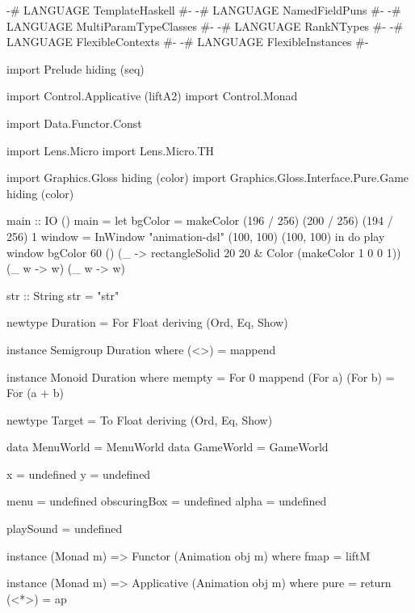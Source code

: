 \begin{code}
{-# LANGUAGE TemplateHaskell #-}
{-# LANGUAGE NamedFieldPuns #-}
{-# LANGUAGE MultiParamTypeClasses #-}
{-# LANGUAGE RankNTypes #-}
{-# LANGUAGE FlexibleContexts #-}
{-# LANGUAGE FlexibleInstances #-}

import Prelude hiding (seq)

import Control.Applicative (liftA2)
import Control.Monad

import Data.Functor.Const

import Lens.Micro
import Lens.Micro.TH

import Graphics.Gloss hiding (color)
import Graphics.Gloss.Interface.Pure.Game hiding (color)

main :: IO ()
main = let
  bgColor = makeColor (196 / 256) (200 / 256) (194 / 256) 1
  window = InWindow "animation-dsl" (100, 100) (100, 100)
  in do
  play window bgColor 60 () (\_ -> rectangleSolid 20 20 & Color (makeColor 1 0 0 1)) (\_ w -> w) (\_ w -> w)

str :: String
str = "str"

newtype Duration = For Float
  deriving (Ord, Eq, Show)

instance Semigroup Duration where
  (<>) = mappend

instance Monoid Duration where
  mempty = For 0
  mappend (For a) (For b) = For (a + b)

newtype Target = To Float
  deriving (Ord, Eq, Show)

data MenuWorld = MenuWorld
data GameWorld = GameWorld

x = undefined
y = undefined

menu = undefined
obscuringBox = undefined
alpha = undefined

playSound = undefined

instance (Monad m) => Functor (Animation obj m) where
  fmap = liftM

instance (Monad m) => Applicative (Animation obj m) where
  pure = return
  (<*>) = ap
\end{code}
